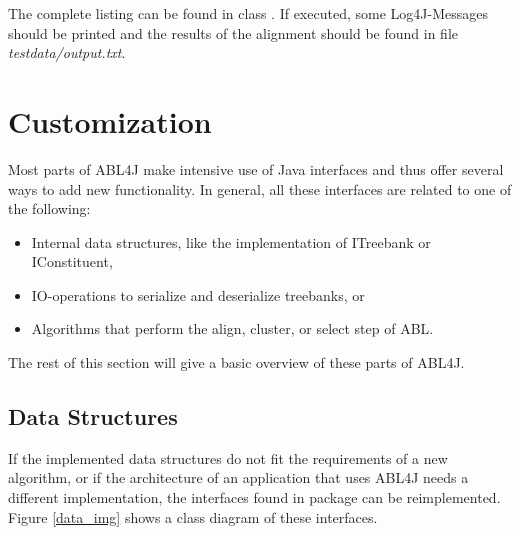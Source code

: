 \documentclass[12pt,a4paper]{article}
\newcommand{\code}[1]{{\ttfamily\selectfont{#1}}}
\begin{document}
The complete listing can be found in class \code{Example1}. If executed, some
Log4J-Messages should be printed and the results of the alignment should be
found in file \emph{testdata/output.txt}.


\section{Customization}\label{customization}
Most parts of ABL4J make intensive use of Java interfaces and thus offer
several ways to add new functionality. In general, all these interfaces are
related to one of the following:

\begin{itemize}
  \item Internal data structures, like the implementation of ITreebank or
  IConstituent,
  \item IO-operations to serialize and deserialize treebanks, or
  \item Algorithms that perform the align, cluster, or select step of ABL.
\end{itemize}

The rest of this section will give a basic overview of these parts of ABL4J.

\subsection{Data Structures}

If the implemented data structures do not fit the requirements of a new
algorithm, or if the architecture of an application that uses ABL4J needs a
different implementation, the interfaces found in package
\code{org.schwiebert.abl4j.data} can be reimplemented. Figure \ref{data_img}
shows a class diagram of these interfaces. 
\end{document}
